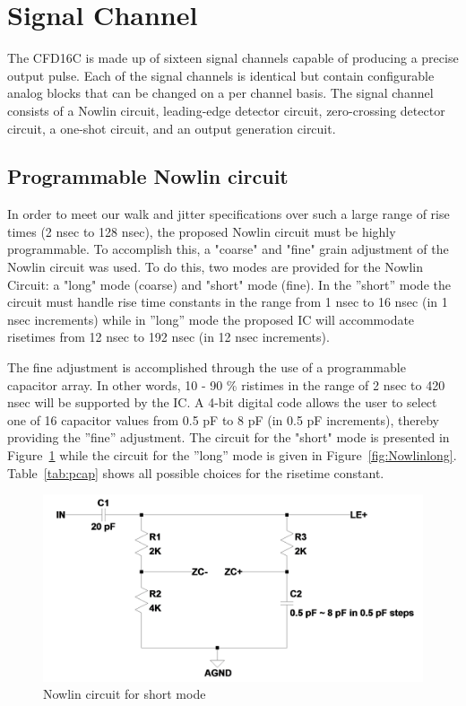 \documentclass[12pt,oneside,final]{siuethesis}
\theoremstyle{definition}
\begin{document}

\section{Signal Channel}
\par The CFD16C is made up of sixteen signal channels capable of producing a precise output pulse. Each of the signal channels is identical but contain configurable analog blocks that can be changed on a per channel basis. The signal channel consists of a Nowlin circuit, leading-edge detector circuit, zero-crossing detector circuit, a one-shot circuit, and an output generation circuit. 

\subsection{Programmable Nowlin circuit}
\par In order to meet our walk and jitter specifications over such a large range of rise times (2 nsec to 128 nsec), the proposed Nowlin circuit must be highly programmable. To accomplish this, a "coarse" and "fine" grain adjustment of the Nowlin circuit was used. To do this, two modes are provided for the Nowlin Circuit: a "long" mode (coarse) and "short" mode (fine). In the ”short” mode the circuit must handle rise time constants in the range from 1 nsec to 16 nsec (in 1 nsec increments) while in ”long” mode the proposed IC will accommodate risetimes from 12 nsec to 192 nsec (in 12 nsec increments).
\par The fine adjustment is accomplished through the use of a programmable capacitor array. In other words, 10 - 90 \% ristimes in the range of 2 nsec to 420 nsec will be supported by the IC. A 4-bit digital code allows the user to select one of 16 capacitor values from 0.5 pF to 8 pF (in 0.5 pF increments), thereby providing the ”fine” adjustment. The circuit for the "short" mode is presented in Figure~\ref{fig:Nowlinshort} while the circuit for the ”long” mode is given in Figure~\ref{fig:Nowlinlong}. Table~\ref{tab:pcap} shows all possible choices for the risetime constant.

\begin{figure}[htbp!]
\centering
\includegraphics[scale=.27,keepaspectratio=true]{../LTspice_Drawings/nowlin/nowlin_short.png} 
\caption{Nowlin circuit for short mode}
\label{fig:Nowlinshort}
\end{figure}
\end{document}
